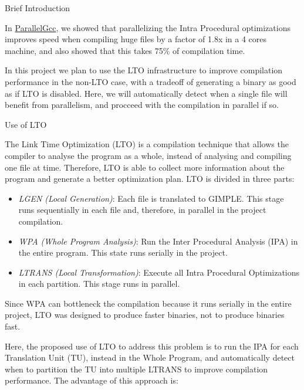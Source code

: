 \documentclass[12pt]{article}
\begin{document}
\begin{section}{Brief Introduction}

In \href{https://gcc.gnu.org/wiki/ParallelGcc}{ParallelGcc}, we showed that parallelizing the Intra Procedural optimizations
improves speed when compiling huge files by a factor of 1.8x in a 4 cores
    machine, and also showed that this takes 75\% of compilation time.

In this project we plan to use the LTO infrastructure to improve
compilation performance in the non-LTO case, with a tradeoff of generating
a binary as good as if LTO is disabled. Here, we will automatically detect
when a single file will benefit from parallelism, and procceed with the
compilation in parallel if so.

\begin{section}{Use of LTO}

The Link Time Optimization (LTO) is a compilation technique that allows the
compiler to analyse the program as a whole, instead of analysing and compiling
one file at time. Therefore, LTO is able to collect more information about
the program and generate a better optimization plan. LTO is divided in three
parts:

\begin{itemize}
    \item \emph{LGEN (Local Generation)}: Each file is translated to GIMPLE. This
        stage runs sequentially in each file and, therefore, in parallel in
        the project compilation.

    \item \emph{WPA (Whole Program Analysis)}: Run the Inter Procedural Analysis (IPA) in the
        entire program. This state runs serially in the project.

    \item \emph{LTRANS (Local Transformation)}: Execute all Intra Procedural Optimizations in
        each partition. This stage runs in parallel.
\end{itemize}

Since WPA can bottleneck the compilation because it runs serially in the entire
project, LTO was designed to produce faster binaries, not to produce binaries
fast.

Here, the proposed use of LTO to address this problem is to run the IPA
for each Translation Unit (TU), instead in the Whole Program, and automatically
detect when to partition the TU into multiple LTRANS to improve compilation performance.
The advantage of this approach is:
\begin{itemize}


\end{itemize}
\end{section}
\end{section}
\end{document}
